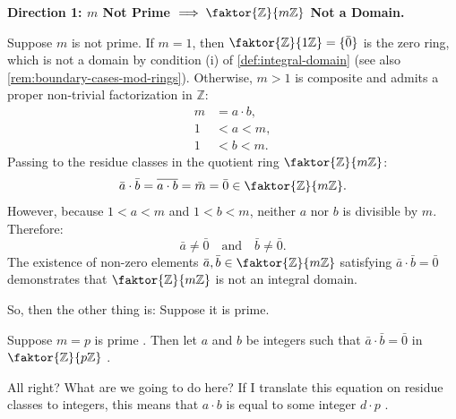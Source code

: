 \begin{proofWrapper}
\begin{content}
\textbf{Direction 1: \texorpdfstring{$m$}{m} Not Prime \texorpdfstring{$\implies \faktor{\mathbb{Z}}{m\mathbb{Z}}$}{=> Z/mZ} Not a Domain.}

Suppose $m$ is not prime. If $m = 1$, then $\faktor{\mathbb{Z}}{1\mathbb{Z}} = \{\bar{0}\}$ is the zero ring, which is not a domain by condition (i) of \cref{def:integral-domain} (see also \cref{rem:boundary-cases-mod-rings}). Otherwise, $m > 1$ is composite and admits a proper non-trivial factorization in $\mathbb{Z}$:
\begin{align}
    m &= a \cdot b, \label{eq:composite-m-factor} \\
    1 &< a < m, \nonumber \\
    1 &< b < m. \nonumber
\end{align}
Passing to the residue classes in the quotient ring $\faktor{\mathbb{Z}}{m\mathbb{Z}}$:
\begin{equation}\label{eq:prod-zero-divisors}
\bar{a} \cdot \bar{b} = \overline{a \cdot b} = \bar{m} = \bar{0} \in \faktor{\mathbb{Z}}{m\mathbb{Z}}.
\end{equation}
However, because $1 < a < m$ and $1 < b < m$, neither $a$ nor $b$ is divisible by $m$. Therefore:
\begin{equation}\label{eq:nonzero-factors}
\bar{a} \neq \bar{0} \quad \text{and} \quad \bar{b} \neq \bar{0}.
\end{equation}
The existence of non-zero elements $\bar{a}, \bar{b} \in \faktor{\mathbb{Z}}{m\mathbb{Z}}$ satisfying $\bar{a} \cdot \bar{b} = \bar{0}$ demonstrates that $\faktor{\mathbb{Z}}{m\mathbb{Z}}$ is not an integral domain.
\end{content}

\begin{speech}[00:19:24 - 00:21:50]
So, then the other thing is: Suppose it is prime.

Suppose $m = p$ is prime . Then let $a$ and $b$ be integers such that $\bar{a} \cdot \bar{b} = \bar{0}$ in $\faktor{\mathbb{Z}}{p\mathbb{Z}}$ .

All right? What are we going to do here? If I translate this equation on residue classes to integers, this means that $a \cdot b$ is equal to some integer $d \cdot p$ .


\end{speech}
\end{proofWrapper}
